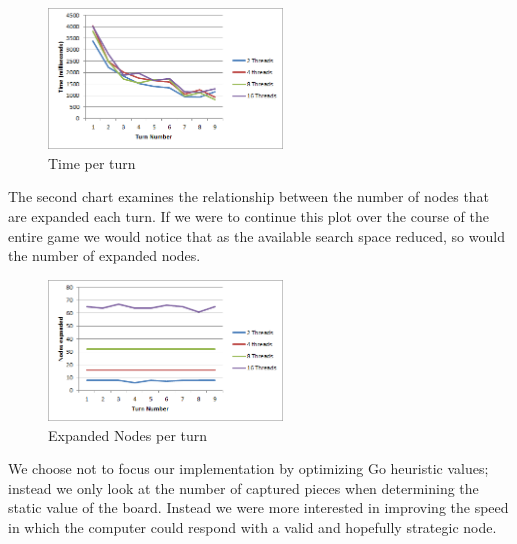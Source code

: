 \documentclass[conference]{IEEEtran}
\begin{document}
\begin{figure}[h]
\includegraphics[width=235px]{TimeVsTurn}
\caption{Time per turn}
\centering
\end{figure}

The second chart examines the relationship between the number of nodes that are expanded each turn. If we were to continue this plot over the course of the entire game we would notice that as the available search space reduced, so would the number of expanded nodes.

\begin{figure}[h]
\includegraphics[width=235px]{NodesVsTurn}
\caption{Expanded Nodes per turn}
\end{figure}

We choose not to focus our implementation by optimizing Go heuristic values; instead we only look at the number of captured pieces when determining the static value of the board. Instead we were more interested in improving the speed in which the computer could respond with a valid and hopefully strategic node.
\end{document}
